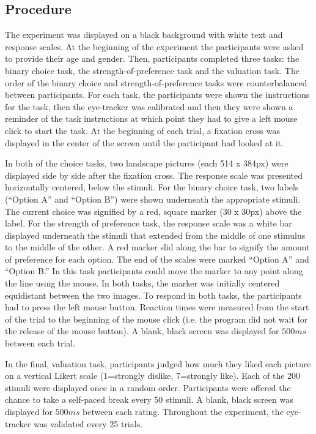 \documentclass[12pt]{article}
\begin{document}
\subsection{Procedure}
The experiment was displayed on a black background with white text and response scales. At the beginning of the experiment the participants were asked to provide their age and gender. Then, participants completed three tasks: the binary choice task, the strength-of-preference task and the valuation task. The order of the binary choice and strength-of-preference tasks were counterbalanced between participants. For each task, the participants were shown the instructions for the task, then the eye-tracker was calibrated and then they were shown a reminder of the task instructions at which point they had to give a left mouse click to start the task. At the beginning of each trial, a fixation cross was displayed in the center of the screen until the participant had looked at it. 

In both of the choice tasks, two landscape pictures (each 514 x 384px) were displayed side by side after the fixation cross. The response scale was presented horizontally centered, below the stimuli. For the binary choice task, two labels (``Option A'' and ``Option B'') were shown underneath the appropriate stimuli. The current choice was signified by a red, square marker (30 x 30px) above the label. For the strength of preference task, the response scale was a white bar displayed underneath the stimuli that extended from the middle of one stimulus to the middle of the other. A red marker slid along the bar to signify the amount of preference for each option. The end of the scales were marked ``Option A'' and ``Option B.'' In this task participants could move the marker to any point along the line using the mouse. In both tasks, the marker was initially centered equidistant between the two images. To respond in both tasks, the participants had to press the left mouse button. Reaction times were measured from the start of the trial to the beginning of the mouse click (i.e. the program did not wait for the release of the mouse button). A blank, black screen was displayed for $500ms$ between each trial.

In the final, valuation task, participants judged how much they liked each picture on a vertical Likert scale (1=strongly dislike, 7=strongly like). Each of the 200 stimuli were displayed once in a random order. Participants were offered the chance to take a self-paced break every 50 stimuli. A blank, black screen was displayed for $500ms$ between each rating. Throughout the experiment, the eye-tracker was validated every 25 trials.
\end{document}
